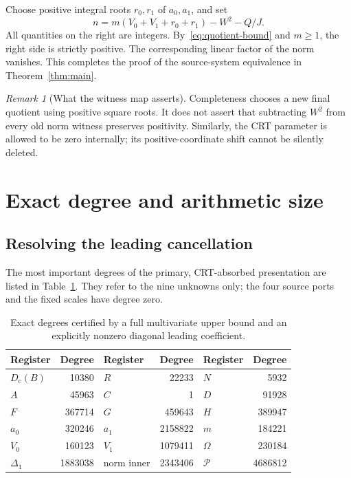 \documentclass[11pt]{article}
\newcommand{\Dc}{D_{\mathrm c}}
\theoremstyle{remark}\newtheorem{remark}[theorem]{Remark}
\begin{document}
Choose positive integral roots $r_0,r_1$ of $a_0,a_1$, and set
\[
 n=m(V_0+V_1+r_0+r_1)-W^2-Q/J.
\]
All quantities on the right are integers. By~\eqref{eq:quotient-bound}
and $m\geq1$, the right side is strictly positive. The corresponding
linear factor of the norm vanishes. This completes the proof of the
source-system equivalence in Theorem~\ref{thm:main}.

\begin{remark}[What the witness map asserts]
Completeness chooses a new final quotient using positive square roots.
It does not assert that subtracting $W^2$ from every old norm witness
preserves positivity. Similarly, the CRT parameter is allowed to be zero
internally; its positive-coordinate shift cannot be silently deleted.
\end{remark}

\section{Exact degree and arithmetic size}\label{sec:metrics}

\subsection{Resolving the leading cancellation}

The most important degrees of the primary, CRT-absorbed presentation are
listed in Table~\ref{tab:degrees}. They refer to the nine unknowns only;
the four source ports and the fixed scales have degree zero.
\begin{table}[ht]
\centering\small
\begin{tabular}{@{}lr@{\qquad}lr@{\qquad}lr@{}}
\toprule
Register & Degree & Register & Degree & Register & Degree\\
\midrule
$\Dc(B)$ &10380 &$R$ &22233 &$N$ &5932\\
$A$ &45963 &$C$ &1 &$D$ &91928\\
$F$ &367714 &$G$ &459643 &$H$ &389947\\
$a_0$ &320246 &$a_1$ &2158822 &$m$ &184221\\
$V_0$ &160123 &$V_1$ &1079411 &$\Omega$ &230184\\
$\Delta_1$ &1883038 &$\text{norm inner}$ &2343406 &$\mathcal P$ &4686812\\
\bottomrule
\end{tabular}
\caption{Exact degrees certified by a full multivariate upper bound and
an explicitly nonzero diagonal leading coefficient.}
\label{tab:degrees}
\end{table}
\end{document}
